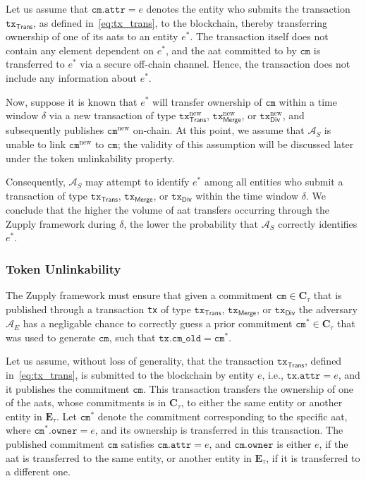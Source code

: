 Let us assume that \( \texttt{cm}.\texttt{attr} = e \) denotes the entity who submits the transaction \( \texttt{tx}_\mathsf{Trans} \), as defined in~\eqref{eq:tx_trans}, to the blockchain, thereby transferring ownership of one of its \glspl{aat} to an entity \( e^* \). The transaction itself does not contain any element dependent on \( e^* \), and the \gls{aat} committed to by \( \texttt{cm} \) is transferred to \( e^* \) via a secure off-chain channel. Hence, the transaction does not include any information about \( e^* \).

Now, suppose it is known that \( e^* \) will transfer ownership of \( \texttt{cm} \) within a time window \( \delta \) via a new transaction of type \( \texttt{tx}^\text{new}_\mathsf{Trans} \), \( \texttt{tx}^\text{new}_\mathsf{Merge} \), or \( \texttt{tx}^\text{new}_\mathsf{Div} \), and subsequently publishes \( \texttt{cm}^\text{new} \) on-chain. At this point, we assume that \( \mathcal{A}_S \) is unable to link \( \texttt{cm}^\text{new} \) to \( \texttt{cm} \); the validity of this assumption will be discussed later under the token unlinkability property.

Consequently, \( \mathcal{A}_S \) may attempt to identify \( e^* \) among all entities who submit a transaction of type \( \texttt{tx}_\mathsf{Trans} \), \( \texttt{tx}_\mathsf{Merge} \), or \( \texttt{tx}_\mathsf{Div} \) within the time window \( \delta \). We conclude that the higher the volume of \gls{aat} transfers occurring through the Zupply framework during \( \delta \), the lower the probability that \( \mathcal{A}_S \) correctly identifies \( e^* \).

\subsubsection{Token Unlinkability}
The Zupply framework must ensure that given a commitment $\texttt{cm} \in \mathbf{C}_\tau$ that is published through a transaction \texttt{tx} of type $\texttt{tx}_\textsf{Trans}$, $\texttt{tx}_\textsf{Merge}$, or $\texttt{tx}_\textsf{Div}$  the adversary \( \mathcal{A}_E \) has a negligable chance to correctly guess a prior commitment $\texttt{cm}^* \in \mathbf{C}_\tau$ that was used to generate $\texttt{cm}$, such that $\texttt{tx}.\texttt{cm\_old} = \texttt{cm}^*$. 

Let us assume, without loss of generality, that the transaction \( \texttt{tx}_\mathsf{Trans} \), defined in~\eqref{eq:tx_trans}, is submitted to the blockchain by entity \( e \), i.e., \( \texttt{tx}.\texttt{attr} = e \), and it publishes the commitment \( \texttt{cm} \). This transaction transfers the ownership of one of the \glspl{aat}, whose commitments is in \( \mathbf{C}_\tau \), to either the same entity or another entity in \( \mathbf{E}_\tau \). Let \( \texttt{cm}^* \) denote the commitment corresponding to the specific \gls{aat}, where \( \texttt{cm}^*.\texttt{owner} = e \), and its ownership is transferred in this transaction. The published commitment \( \texttt{cm} \) satisfies \( \texttt{cm}.\texttt{attr} = e \), and \( \texttt{cm}.\texttt{owner} \) is either \( e \), if the \gls{aat} is transferred to the same entity, or another entity in \( \mathbf{E}_\tau \), if it is transferred to a different one.



